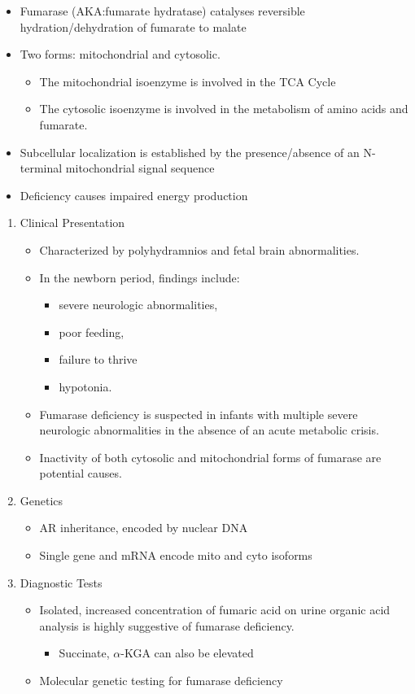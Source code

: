 \documentclass{scrartcl}
\begin{document}
\begin{itemize}
\item Fumarase (AKA:fumarate hydratase) catalyses reversible
hydration/dehydration of fumarate to malate
\end{itemize}
\begin{itemize}
\item Two forms: mitochondrial and cytosolic.
\begin{itemize}
\item The mitochondrial isoenzyme is involved in the TCA Cycle
\item The cytosolic isoenzyme is involved in the metabolism of amino acids and fumarate.
\end{itemize}
\item Subcellular localization is established by the presence/absence of an N-terminal mitochondrial signal
sequence
\item Deficiency causes impaired energy production
\end{itemize}

\begin{enumerate}
\item Clinical Presentation
\label{sec:org7c4c5c5}
\begin{itemize}
\item Characterized by polyhydramnios and fetal brain abnormalities.
\item In the newborn period, findings include:
\begin{itemize}
\item severe neurologic abnormalities,
\item poor feeding,
\item failure to thrive
\item hypotonia.
\end{itemize}
\item Fumarase deficiency is suspected in infants with multiple severe
neurologic abnormalities in the absence of an acute metabolic
crisis.
\item Inactivity of both cytosolic and mitochondrial forms of
fumarase are potential causes.
\end{itemize}
\item Genetics
\label{sec:org89393b8}
\begin{itemize}
\item AR inheritance, encoded by nuclear DNA
\item Single gene and mRNA encode mito and cyto isoforms
\end{itemize}
\item Diagnostic Tests
\label{sec:org3030c00}
\begin{itemize}
\item Isolated, increased concentration of fumaric acid on urine organic
acid analysis is highly suggestive of fumarase deficiency.
\begin{itemize}
\item Succinate, \(\alpha\)-KGA can also be elevated
\end{itemize}
\item Molecular genetic testing for fumarase deficiency
\end{itemize}
\end{enumerate}
\end{document}
